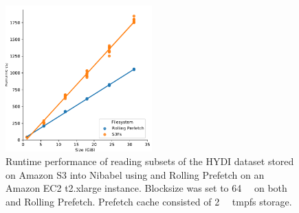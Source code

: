 \documentclass[conference]{IEEEtran}
\begin{document}



\begin{figure}
\begin{center}
\includegraphics[height=160pt]{figures/filesize.pdf}
\setlength{\abovecaptionskip}{0pt}
\setlength{\belowcaptionskip}{-10pt}
\caption{Runtime performance of reading subsets of the HYDI dataset stored on Amazon S3 into Nibabel using \sfs and Rolling Prefetch on an Amazon EC2 t2.xlarge instance. Blocksize was set to \SI{64}{\mebi\byte} on both \sfs and
Rolling Prefetch. Prefetch cache consisted of \SI{2}{\gibi\byte} tmpfs storage.}
\label{fig:filesize}
\end{center}
\end{figure}
\end{document}
